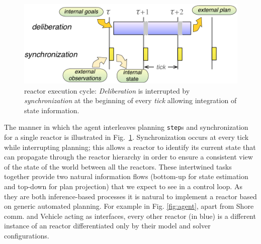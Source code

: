 \label{sec:delib-exec-as}
\begin{figure}[!htbp]
  \centering
  \vskip-1pc
  \includegraphics[width=0.55\columnwidth]{figs/tick-cycle}
  \caption{\small \rx reactor execution cycle: {\em Deliberation} is
    interrupted by {\em synchronization} at the beginning of every
    {\em tick} allowing integration of state information.}
  \label{fig:tick-exec}
  \vskip-0.8pc
\end{figure}

The manner in which the agent interleaves planning \texttt{step}s and
synchronization for a single reactor is illustrated in
Fig.~\ref{fig:tick-exec}. Synchronization occurs at every tick while
interrupting planning; this allows a reactor to identify its current
state that can propagate through the reactor hierarchy in order to
ensure a consistent view of the state of the world between all the
reactors.
These intertwined tasks together provide two natural information flows
(bottom-up for state estimation and top-down for plan projection) that
we expect to see in a control loop. As they are both inference-based
processes it is natural to implement a reactor based on generic
automated planning. For example in Fig. \ref{fig:agent}, apart from
\textsf{Shore comm.} and \textsf{Vehicle} acting as interfaces, every
other reactor (in blue) is a different instance of an \eu reactor
differentiated only by their model and \eu solver configurations.

